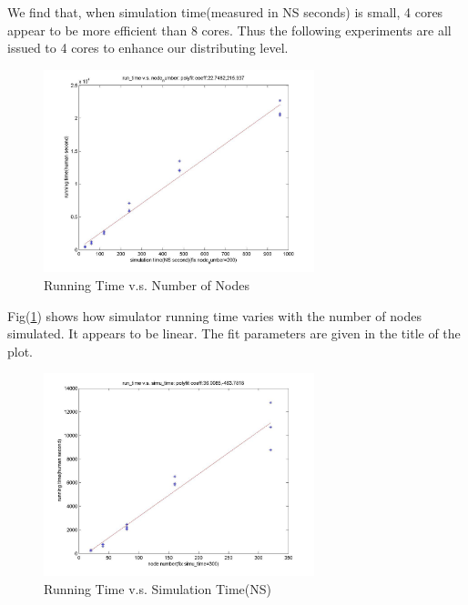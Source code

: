 \documentclass[11pt,a4paper]{article}
\begin{document}
We find that, when simulation time(measured in NS seconds) is small, 
4 cores appear to be more efficient than 8 cores. Thus the following 
experiments are all issued to 4 cores to enhance our distributing level. 


\begin{figure}[htb]
\centering
	\includegraphics[width=0.7\textwidth]{../fig/runtime_vs_nodenum.jpg}
	\caption{Running Time v.s. Number of Nodes}
	\label{fig:simu_bm_rt_node}
\end{figure}

Fig(\ref{fig:simu_bm_rt_node}) shows how simulator running time 
varies with the number of nodes simulated. 
It appears to be linear. The fit parameters are given in 
the title of the plot. 


\begin{figure}[htb]
\centering
	\includegraphics[width=0.7\textwidth]{../fig/runtime_vs_simutime.jpg}
	\caption{Running Time v.s. Simulation Time(NS)}
	\label{fig:simu_bm_rt_st}
\end{figure}
\end{document}

